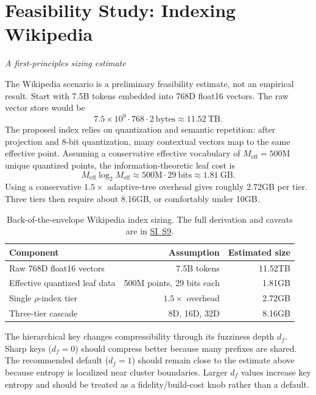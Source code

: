 \documentclass[11pt]{article}
\newcommand{\sectionsubtitle}[1]{\vspace{-0.25em}\noindent\textit{#1}\par\vspace{0.75em}}
\begin{document}
\section{Feasibility Study: Indexing Wikipedia}
\label{sec:wikipedia}
\sectionsubtitle{A first-principles sizing estimate}

The Wikipedia scenario is a preliminary feasibility estimate, not an empirical result. Start with 7.5B tokens embedded into 768D float16 vectors. The raw vector store would be
\[
7.5\times10^9 \cdot 768 \cdot 2\ \mathrm{bytes} \approx 11.52\ \mathrm{TB}.
\]
The proposed index relies on quantization and semantic repetition: after projection and 8-bit quantization, many contextual vectors map to the same effective point. Assuming a conservative effective vocabulary of $M_{\mathrm{eff}}=500$M unique quantized points, the information-theoretic leaf cost is
\[
M_{\mathrm{eff}}\log_2 M_{\mathrm{eff}}\approx 500\mathrm{M}\cdot 29\ \mathrm{bits}\approx 1.81\ \mathrm{GB}.
\]
Using a conservative $1.5\times$ adaptive-tree overhead gives roughly 2.72GB per tier. Three tiers then require about 8.16GB, or comfortably under 10GB.

\begin{table}[t]
\centering
\begin{tabular}{lrr}
\toprule
\textbf{Component} & \textbf{Assumption} & \textbf{Estimated size}\\
\midrule
Raw 768D float16 vectors & 7.5B tokens & 11.52TB\\
Effective quantized leaf data & 500M points, 29 bits each & 1.81GB\\
Single $\rho$-index tier & $1.5\times$ overhead & 2.72GB\\
Three-tier cascade & 8D, 16D, 32D & 8.16GB\\
\bottomrule
\end{tabular}
\caption{Back-of-the-envelope Wikipedia index sizing. The full derivation and caveats are in \hyperref[sec:si-wikipedia]{SI~S9}.}
\label{tab:wikipedia-size}
\end{table}

The hierarchical key changes compressibility through its fuzziness depth $d_f$. Sharp keys ($d_f=0$) should compress better because many prefixes are shared. The recommended default ($d_f=1$) should remain close to the estimate above because entropy is localized near cluster boundaries. Larger $d_f$ values increase key entropy and should be treated as a fidelity/build-cost knob rather than a default.
\end{document}
